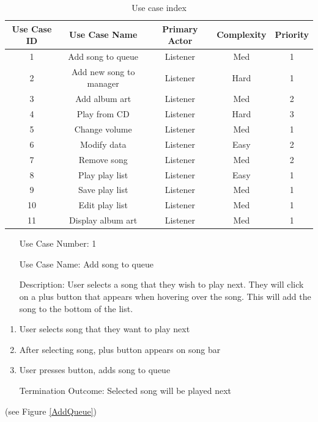 \documentclass[10pt,conference,onecolumn,compsoc]{IEEEtran}
\begin{document}
\begin{table}
\centering
\begin{tabular}{|c|c|c|c|c|}
\hline
Use Case ID & Use Case Name & Primary Actor & Complexity & Priority \\
\hline \hline
1 & Add song to queue & Listener & Med & 1\\
\hline
2 & Add new song to manager & Listener & Hard & 1\\
\hline
3 & Add album art & Listener & Med & 2\\
\hline
4 & Play from CD & Listener & Hard & 3\\
\hline
5 & Change volume & Listener & Med & 1\\
\hline
6 & Modify data & Listener & Easy & 2\\
\hline
7 & Remove song & Listener & Med & 2\\
\hline
8 & Play play list & Listener & Easy & 1\\
\hline
9 & Save play list & Listener & Med & 1\\
\hline
10 & Edit play list & Listener & Med & 1\\
\hline
11 & Display album art & Listener & Med & 1\\
\hline

\end{tabular}
\caption{Use case index}
\label{tab:useCaseIndex}
\end{table}


\begin{itemize}
\item[Use Case Number:] 1
\item[Use Case Name:] Add song to queue
\item[Description:] User selects a song that they wish to play next. They will click on a plus button that appears when hovering over the song. This will add the song to the bottom of the list.
\end{itemize}

\begin{enumerate}
\item User selects song that they want to play next
\item After selecting song, plus button appears on song bar
\item User presses button, adds song to queue
\item[Termination Outcome:] Selected song will be played next
\end{enumerate}

(see Figure \ref{AddQueue})
\end{document}
